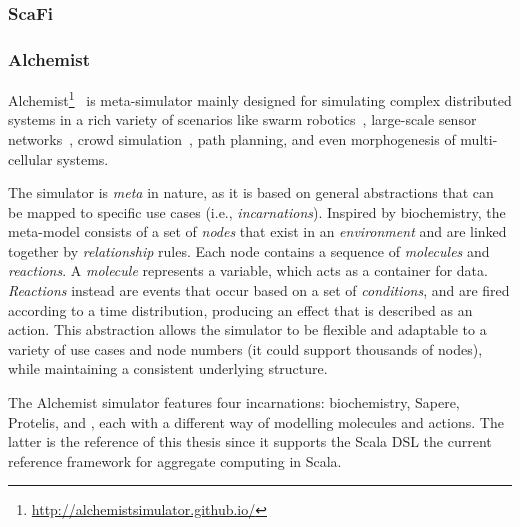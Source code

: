 \subsubsection{ScaFi}\label{sec:scafi}


\subsubsection{Alchemist}\label{coordination2023:alchemist}
Alchemist\footnote{\url{http://alchemistsimulator.github.io/}}~\cite{alchemist} is meta-simulator
 mainly designed for simulating complex distributed systems 
 in a rich variety of scenarios like swarm robotics~\cite{aguzzi2023macroswarm},
 large-scale sensor networks~\cite{Aguzzi_2022}, crowd simulation~\cite{aggregatecomputing},
 path planning, and even morphogenesis of multi-cellular systems.

The simulator is \emph{meta} in nature, 
 as it is based on general abstractions 
 that can be mapped to specific use cases (i.e., \emph{incarnations}).
% 
Inspired by biochemistry, 
 the meta-model consists of a set of \emph{nodes} 
 that exist in an \emph{environment} and are linked together by \emph{relationship} rules. 
 Each node contains a sequence of \emph{molecules} and \emph{reactions}. 
%
 A \emph{molecule} represents a variable, 
 which acts as a container for data. 
 \emph{Reactions} instead are events that occur based 
 on a set of \emph{conditions}, 
 and are fired according to a time distribution, 
 producing an effect that is described as an action. 
This abstraction allows the simulator to be flexible 
 and adaptable to a variety of use cases and node numbers 
 (it could support thousands of nodes), 
 while maintaining a consistent underlying structure.

 The Alchemist simulator features four incarnations: 
  biochemistry, Sapere, Protelis, and \scafi{},
  each with a different way of modelling molecules and actions.
The latter is the reference of this thesis since it supports the \scafi{} Scala DSL
 the current reference framework for aggregate computing in Scala.

